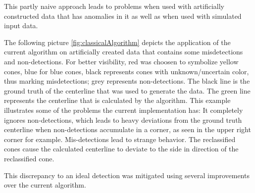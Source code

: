This partly naive approach leads to problems when used with artificially constructed data that has anomalies in it as well as when used with simulated input data.

The following picture \ref{fig:classicalAlgorithm} depicts the application of the current algorithm on artificially created data that contains some misdetections and non-detections. For better visibility, red was choosen to symbolize yellow cones, blue for blue cones, black represents cones with unknown/uncertain color, thus marking misdetections; grey represents non-detections. The black line is the ground truth of the centerline that was used to generate the data. The green line represents the centerline that is calculated by the algorithm. This example illustrates some of the problems the current implementation has: It completely ignores non-detections, which leads to heavy deviations from the ground truth centerline when non-detections accumulate in a corner, as seen in the upper right corner for example. Mis-detections lead to strange behavior. The reclassified cones cause the calculated centerline to deviate to the side in direction of the reclassified cone.


This discrepancy to an ideal detection was mitigated using several improvements over the current algorithm.

